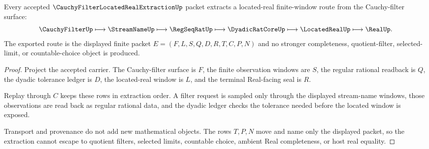 \begin{theorem}
\label{thm:cauchy-filter-located-real-extraction}
Every accepted $\CauchyFilterLocatedRealExtractionUp$ packet extracts a located-real finite-window route from the Cauchy-filter surface:
$$
\CauchyFilterUp \longmapsto \StreamNameUp \longmapsto \RegSeqRatUp \longmapsto \DyadicRatCoreUp \longmapsto \LocatedRealUp \longmapsto \RealUp .
$$
The exported route is the displayed finite packet $E=(F,L,S,Q,D,R,T,C,P,N)$ and no stronger completeness, quotient-filter, selected-limit, or countable-choice object is produced.
\end{theorem}
\begin{proof}
Project the accepted carrier. The Cauchy-filter surface is $F$, the finite observation windows are $S$, the regular rational readback is $Q$, the dyadic tolerance ledger is $D$, the located-real window is $L$, and the terminal Real-facing seal is $R$.

Replay through $C$ keeps these rows in extraction order. A filter request is sampled only through the displayed stream-name windows, those observations are read back as regular rational data, and the dyadic ledger checks the tolerance needed before the located window is exposed.

Transport and provenance do not add new mathematical objects. The rows $T,P,N$ move and name only the displayed packet, so the extraction cannot escape to quotient filters, selected limits, countable choice, ambient Real completeness, or host real equality.
\end{proof}


\begin{closurestatus}{\CauchyFilterLocatedRealExtractionUp}
  \theoryclosure{\seedClosure}
  \formalstatus{\unformalizedV}
\end{closurestatus}
